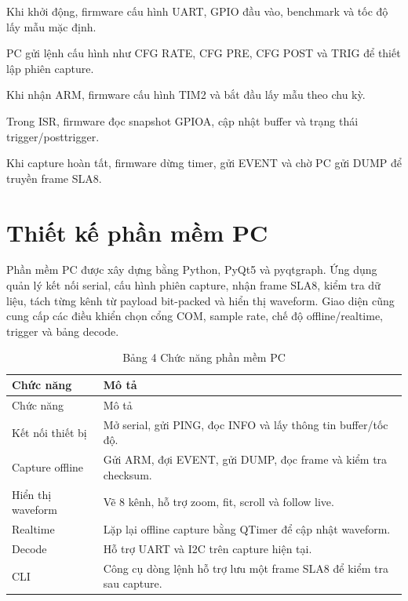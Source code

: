 Khi khởi động, firmware cấu hình UART, GPIO đầu vào, benchmark và tốc độ lấy mẫu mặc định.

PC gửi lệnh cấu hình như CFG RATE, CFG PRE, CFG POST và TRIG để thiết lập phiên capture.

Khi nhận ARM, firmware cấu hình TIM2 và bắt đầu lấy mẫu theo chu kỳ.

Trong ISR, firmware đọc snapshot GPIOA, cập nhật buffer và trạng thái trigger/posttrigger.

Khi capture hoàn tất, firmware dừng timer, gửi EVENT và chờ PC gửi DUMP để truyền frame SLA8.

\section{Thiết kế phần mềm PC}\label{thiux1ebft-kux1ebf-phux1ea7n-mux1ec1m-pc}

Phần mềm PC được xây dựng bằng Python, PyQt5 và pyqtgraph. Ứng dụng quản lý kết nối serial, cấu hình phiên capture, nhận frame SLA8, kiểm tra dữ liệu, tách từng kênh từ payload bit-packed và hiển thị waveform. Giao diện cũng cung cấp các điều khiển chọn cổng COM, sample rate, chế độ offline/realtime, trigger và bảng decode.

\begin{longtable}[]{@{}
  >{\raggedright\arraybackslash}p{}
  >{\raggedright\arraybackslash}p{}@{}}
\caption{Bảng 4 Chức năng phần mềm PC}\tabularnewline
\toprule\noalign{}
\begin{minipage}[b]{\linewidth}\raggedright
Chức năng
\end{minipage} & \begin{minipage}[b]{\linewidth}\raggedright
Mô tả
\end{minipage} \\
\midrule\noalign{}
\endfirsthead
\toprule\noalign{}
\begin{minipage}[b]{\linewidth}\raggedright
Chức năng
\end{minipage} & \begin{minipage}[b]{\linewidth}\raggedright
Mô tả
\end{minipage} \\
\midrule\noalign{}
\endhead
\bottomrule\noalign{}
\endlastfoot
Kết nối thiết bị & Mở serial, gửi PING, đọc INFO và lấy thông tin buffer/tốc độ. \\
Capture offline & Gửi ARM, đợi EVENT, gửi DUMP, đọc frame và kiểm tra checksum. \\
Hiển thị waveform & Vẽ 8 kênh, hỗ trợ zoom, fit, scroll và follow live. \\
Realtime & Lặp lại offline capture bằng QTimer để cập nhật waveform. \\
Decode & Hỗ trợ UART và I2C trên capture hiện tại. \\
CLI & Công cụ dòng lệnh hỗ trợ lưu một frame SLA8 để kiểm tra sau capture. \\
\end{longtable}

